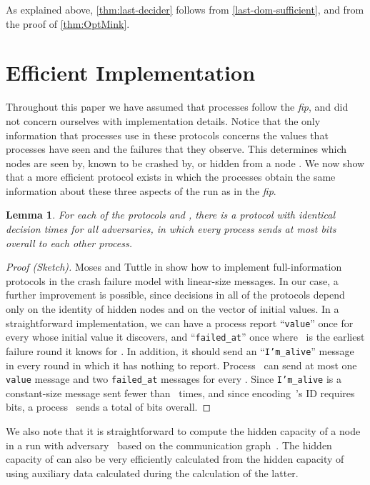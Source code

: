 \documentclass[11pt]{article}
\newtheorem{lemma}{Lemma}
\theoremstyle{definition}
\newcommand{\fip}{{\it fip}}
\begin{document}
As explained above, \cref{thm:last-decider} follows from \cref{last-dom-sufficient}, and from the proof of \cref{thm:OptMink}.

\section{Efficient Implementation}\label{sec-com-eff}

Throughout this paper we have assumed that processes follow the \fip, and did not concern ourselves with implementation details. Notice that the only information that processes use in these protocols concerns the values that processes have seen and the failures that they observe. This determines which nodes are seen by, known to be crashed by, or hidden from a node . We now show that a more efficient protocol exists in which the processes obtain the same information about these three aspects of the run as in the \fip.

\begin{lemma}
For each of the protocols  and , there is a protocol with identical decision times for all adversaries, in which every process sends at most  bits overall to each other process.
\end{lemma}

\begin{proof}[Proof (Sketch)]
Moses and Tuttle in \cite{MT} show how to implement full-information protocols in the crash failure model with linear-size messages. In our case, a further improvement is possible, since decisions in all of the protocols depend only on the identity of hidden nodes and on the vector of initial values. In a straightforward implementation, we can have a process  report  ``{\tt value}'' once for every  whose initial value it discovers, and ``{\tt failed\_at}'' once where~ is the earliest failure round it knows for . In addition, it should send an ``{\tt I'm\_alive}'' message in every round in which it has nothing to report. Process~ can send at most one {\tt value} message and two
{\tt failed\_at} messages for every . Since {\tt I'm\_alive} is a constant-size message sent fewer than~ times, and since encoding~'s ID requires  bits, a process~ sends a total of  bits overall.
\end{proof}

We also note that it is straightforward to compute the hidden capacity of a node 
in a run with adversary~ based on the communication graph~. The hidden capacity
of  can also be very efficiently calculated from the hidden capacity of  using auxiliary
data calculated during the calculation of the latter.
\end{document}
